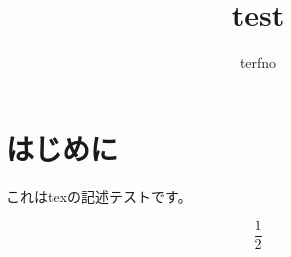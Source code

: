 \documentclass{jsarticle}
\begin{document}
  \title{test}
  \author{terfno}
  \maketitle

  \section{はじめに}
  これはtexの記述テストです。

  $$
    \frac{1}{2}
  $$
\end{document}
